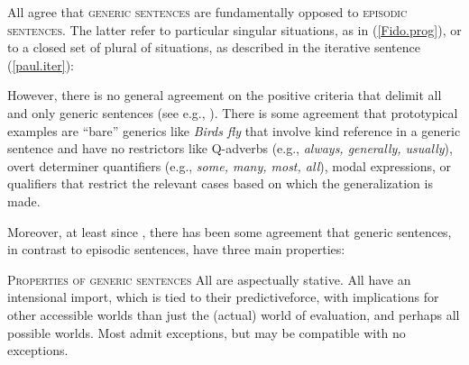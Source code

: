 \documentclass[output=paper,colorlinks,citecolor=brown]{langscibook}
\begin{document}
All agree that \textsc{generic sentences} are fundamentally opposed to \textsc{episodic sentences}. 
The latter refer to particular singular situations, as in (\ref{Fido.prog}), 
or to a closed set of plural of situations, as described in 
the iterative sentence (\ref{paul.iter}):

   
\z

 
\noindent
However, there is no general agreement on the positive criteria that delimit all and only generic sentences (see e.g., \citealt{Dahl1985,dahl1995,nickel2008,nickel2016,
pelletier-equal2009,pelletier-intro2009,carlson2013}). There is some agreement that prototypical examples are ``bare'' generics like \textit{Birds fly} 
that involve kind reference in a generic sentence
and have no 
restrictors like Q-adverbs (e.g., \textit{always, generally, usually}), 
overt determiner quantifiers (e.g., \textit{some, many, most, all}), 
modal expressions, or qualifiers that restrict the relevant cases based on which the generalization is made.

Moreover, at least since \citet{carlson1977unified}, 
there has been some agreement
that generic sentences, in contrast to episodic sentences, have three main properties: 

\eanoraggedright \textsc{Properties of generic sentences}
\eanoraggedright All are aspectually stative.
\ex All have an intensional import, which is tied to their predictive\linebreak force, with implications for other accessible worlds than just the (actual) world of evaluation, and perhaps all possible worlds.
\ex Most admit exceptions, but may be compatible with no exceptions. 
\z 
\z 
\end{document}
